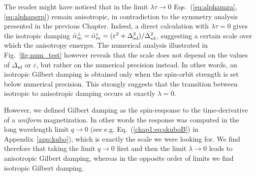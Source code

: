 

The reader might have noticed that in the limit $\lambda\tau\rightarrow0$ Eqs.~(\ref{eq:alphapara},\ref{eq:alphaperp}) remain anisotropic, in contradiction to the symmetry analysis presented in the previous Chapter. Indeed, a direct calculation with $\lambda\tau=0$ gives the isotropic damping $\bar{\alpha}_m^{\perp}=\bar{\alpha}_m^{{\scriptscriptstyle\parallel}}=(\varepsilon^2+\Delta_\text{sd}^2)/\Delta_\text{sd}^2$, suggesting a certain scale over which the anisotropy emerges. The numerical analysis illustrated in Fig.~\ref{fig:num_test} however reveals that the scale does not depend on the values of $\Delta_\text{sd}$ or $\varepsilon$, but rather on the numerical precision instead. In other words, an isotropic Gilbert damping is obtained only when the spin-orbit strength is set below numerical precision. This strongly suggests that the transition between isotropic to anisotropic damping occurs at exactly $\lambda=0$. 

However, we defined Gilbert damping as the spin-response to the time-derivative of a \emph{uniform} magnetization. In other words the response was computed in the long wavelength limit $q\rightarrow0$ (see e.g. Eq.~(\ref{chap1:eq:skuboB}) in Appendix~\ref{app:kubo}), which is exactly the scale we were looking for. We find therefore that taking the limit $q\rightarrow0$ first and then the limit $\lambda\rightarrow0$ leads to anisotropic Gilbert damping, whereas in the opposite order of limits we find isotropic Gilbert damping.  


